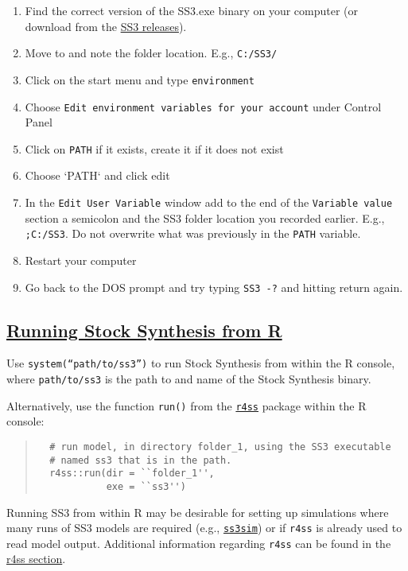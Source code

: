\begin{enumerate}
  \item Find the correct version of the SS3.exe binary on your computer (or download from the \href{https://github.com/nmfs-ost/ss3-source-code/releases}{SS3 releases}).
  \item Move to and note the folder location. E.g., \texttt{C:/SS3/}
  \item Click on the start menu and type \texttt{environment}
  \item Choose \texttt{Edit environment variables for your account} under Control Panel
  \item Click on \texttt{PATH} if it exists, create it if it does not exist 
  \item Choose `PATH` and click edit
  \item In the \texttt{Edit User Variable} window add to the end of the \texttt{Variable value} section a semicolon and the SS3 folder location you recorded earlier.
     E.g., \texttt{;C:/SS3}. Do not overwrite what was previously in the \texttt{PATH} variable.
  \item Restart your computer
  \item Go back to the DOS prompt and try typing \texttt{SS3 -?} and hitting return again.
\end{enumerate}

\hypertarget{SS3inR}{}
\subsection[Running Stock Synthesis from R]{\protect\hyperlink{SS3inR}{Running Stock Synthesis from R}}
Use \texttt{system(``path/to/ss3'')} to run Stock Synthesis from within the R console, where \texttt{path/to/ss3} is the path to and name of the Stock Synthesis binary.

Alternatively, use the function \texttt{run()} from the \href{https://r4ss.github.io/r4ss/index.html}{\texttt{r4ss}} package within the R console:

\begin{quote}
  \begin{verbatim}
  # run model, in directory folder_1, using the SS3 executable
  # named ss3 that is in the path.
  r4ss::run(dir = ``folder_1'',
            exe = ``ss3'')
  \end{verbatim}
\end{quote}



Running SS3 from within R may be desirable for setting up simulations where many runs of SS3 models are required (e.g., \href{https://github.com/ss3sim/ss3sim}{\texttt{ss3sim}}) or if \texttt{r4ss} is already used to read model output. Additional information regarding \texttt{r4ss} can be found in the \hyperref[sec:r4ss]{r4ss section}. 

